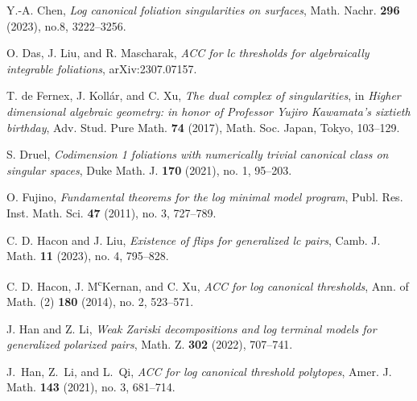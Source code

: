 \documentclass[12pt]{amsart}
\numberwithin{equation}{section}
\theoremstyle{definition}
\theoremstyle{definition}
\theoremstyle{definition}
\begin{document}
\begin{thebibliography}{99}
 Y.-A. Chen, \textit{Log canonical foliation singularities on surfaces}, Math. Nachr. \textbf{296} (2023), no.8, 3222--3256.

 O. Das, J. Liu, and R. Mascharak, \textit{ACC for lc thresholds for algebraically integrable foliations}, arXiv:2307.07157.

 T. de Fernex, J. Koll\'ar, and C. Xu, \textit{The dual complex of singularities}, in \textit{Higher dimensional algebraic geometry: in honor of Professor Yujiro Kawamata’s sixtieth birthday}, Adv. Stud. Pure Math. \textbf{74} (2017), Math. Soc. Japan, Tokyo, 103--129. 


 S. Druel, \textit{Codimension 1 foliations with numerically trivial canonical class on singular spaces}, Duke Math. J. \textbf{170} (2021), no. 1, 95--203.


 O. Fujino, \textit{Fundamental theorems for the log minimal model program}, Publ. Res. Inst. Math. Sci. \textbf{47} (2011), no. 3, 727--789.


 C. D. Hacon and J. Liu, \textit{Existence of flips for generalized lc pairs}, Camb. J. Math. \textbf{11} (2023), no. 4, 795--828.  

 C. D. Hacon, J. M\textsuperscript{c}Kernan, and C. Xu, \textit{ACC for log canonical thresholds}, Ann. of Math. (2) \textbf{180} (2014), no. 2, 523--571.


 J. Han and Z. Li, \textit{Weak Zariski decompositions and log terminal models for generalized polarized pairs}, Math. Z. \textbf{302} (2022), 707--741.

 J.~Han, Z.~Li, and L.~Qi, \textit{ACC for log canonical threshold polytopes}, Amer. J. Math. \textbf{143} (2021), no. 3, 681--714. 


\end{thebibliography}
\end{document}
